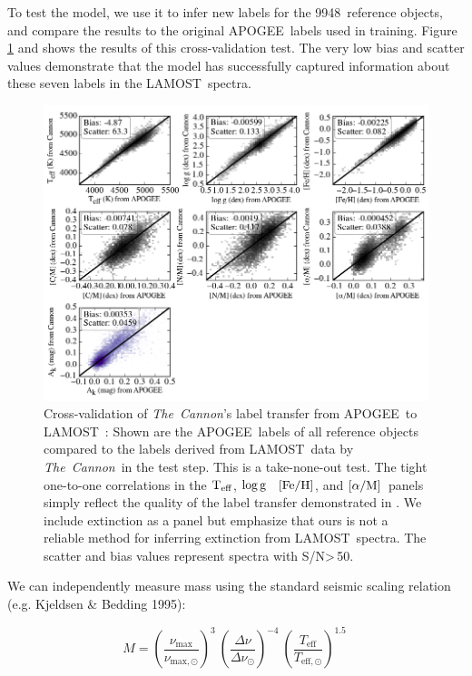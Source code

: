 \documentclass[12pt, preprint]{aastex}
\newcommand{\tc}{\textsl{The~Cannon}}
\newcommand{\apogee}{APOGEE}
\newcommand{\lamost}{LAMOST}
\newcommand{\teff}{\mbox{$\rm T_{eff}$}}
\newcommand{\logg}{\mbox{$\rm \log g$}}
\newcommand{\feh}{\mbox{$\rm [Fe/H]$}}
\newcommand{\alpham}{\mbox{$\rm [\alpha/M]$}}
\newcommand{\ntrobj}{9948}
\newcommand{\snr}{S/N}
\begin{document}
To test the model, we use it to infer new labels for the
\ntrobj\ reference objects, and compare the results 
to the original \apogee\ labels used in training.
Figure \ref{fig:cross-validation} and 
shows the results of
this cross-validation test. The very low bias
and scatter values demonstrate 
that the model has successfully
captured information about these seven labels in the
\lamost\ spectra.

\begin{figure}[!hp]
\centering
\includegraphics[scale=0.75]{xval.png}
\caption{Cross-validation of \tc 's label transfer from \apogee\ to \lamost~: Shown are the \apogee\ labels of all reference objects compared to the labels derived from \lamost\ data by \tc\ in the test step. This is a take-none-out test. The tight one-to-one correlations in the \teff , \logg~ \feh, and \alpham\ panels simply reflect the quality of the label transfer demonstrated in \citet{Ho2016}.
We include extinction as a panel
but emphasize that ours is not a reliable method for 
inferring extinction from \lamost\ spectra.
The scatter and bias values represent spectra with \snr\textgreater\,50.
}
\label{fig:cross-validation}
\end{figure}

We can independently measure mass using the standard seismic scaling relation (e.g. Kjeldsen \& Bedding 1995):

\begin{equation} \label{eq:mass}
M= \left( \frac{\nu_{\mathrm{max}}}{\nu_{\mathrm{max,\odot}}}\right)^3\  \left( \frac{\Delta \nu}{\Delta \nu_{\odot}}\right)^{-4} \ \left( \frac{T_{\mathrm{eff}}}{T_{\mathrm{eff,\odot}}}\right)^{1.5} \ 
\end{equation}
\end{document}
